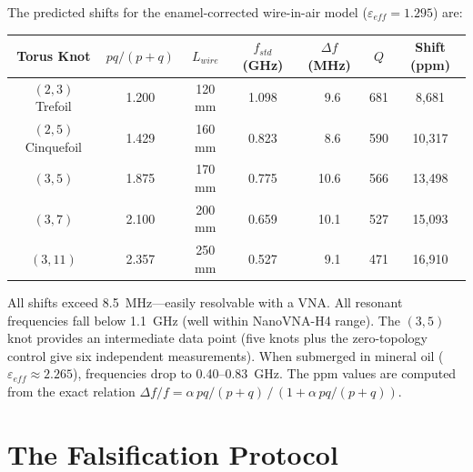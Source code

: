 The predicted shifts for the enamel-corrected wire-in-air model ($\varepsilon_{eff} = 1.295$) are:

\begin{center}
\begin{tabular}{|c|c|c|c|c|c|c|}
\hline
Torus Knot & $pq/(p{+}q)$ & $L_{wire}$ & $f_{std}$ (GHz) & $\Delta f$ (MHz) & $Q$ & Shift (ppm) \\ \hline
$(2,3)$ Trefoil    & 1.200 & 120 mm & 1.098 & $\phantom{0}$9.6 & 681 & 8{,}681  \\
$(2,5)$ Cinquefoil & 1.429 & 160 mm & 0.823 & $\phantom{0}$8.6 & 590 & 10{,}317 \\
$(3,5)$            & 1.875 & 170 mm & 0.775 & 10.6 & 566 & 13{,}498 \\
$(3,7)$            & 2.100 & 200 mm & 0.659 & 10.1 & 527 & 15{,}093 \\
$(3,11)$           & 2.357 & 250 mm & 0.527 & $\phantom{0}$9.1 & 471 & 16{,}910 \\ \hline
\end{tabular}
\end{center}

All shifts exceed 8.5~MHz---easily resolvable with a VNA. All resonant frequencies fall below 1.1~GHz (well within NanoVNA-H4 range). The $(3,5)$ knot provides an intermediate data point (five knots plus the zero-topology control give six independent measurements). When submerged in mineral oil ($\varepsilon_{eff} \approx 2.265$), frequencies drop to 0.40--0.83~GHz. The ppm values are computed from the exact relation $\Delta f/f = \alpha\,pq/(p{+}q)\,/\,(1 + \alpha\,pq/(p{+}q))$.

\section{The Falsification Protocol}

